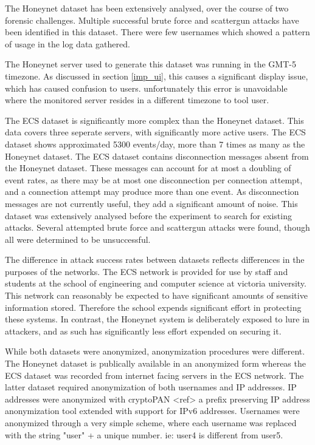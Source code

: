 The Honeynet dataset has been extensively analysed, over the course of two forensic challenges. Multiple successful brute force and scattergun attacks have been identified in this dataset. There were few usernames which showed a pattern of usage in the log data gathered. 

The Honeynet server used to generate this dataset was running in the GMT-5 timezone. As discussed in section \ref{imp_ui}, this causes a significant display issue, which has caused confusion to users. unfortunately this error is unavoidable where the monitored server resides in a different timezone to tool user.

The ECS dataset is significantly more complex than the Honeynet dataset. This data covers three seperate servers, with significantly more active users. The ECS dataset shows approximated 5300 events/day, more than 7 times as many as the Honeynet dataset. The ECS dataset contains disconnection messages absent from the Honeynet dataset. These messages can account for at most a doubling of event rates, as there may be at most one disconnection per connection attempt, and a connection attempt may produce more than one event. As disconnection messages are not currently useful, they add a significant amount of noise. This dataset was extensively analysed before the experiment to search for existing attacks. Several attempted brute force and scattergun attacks were found, though all were determined to be unsuccessful.  

The difference in attack success rates between datasets reflects differences in the purposes of the networks. The ECS network is provided for use by staff and students at the school of engineering and computer science at victoria university. This network can reasonably be expected to have significant amounts of sensitive information stored. Therefore the school expends significant effort in protecting these systems. In contrast, the Honeynet system is deliberately exposed to lure in attackers, and as such has significantly less effort expended on securing it.

While both datasets were anonymized, anonymization procedures were different. The Honeynet dataset is publically available in an anonymized form \cite{forensic10} whereas the ECS dataset was recorded from internet facing servers in the ECS network. The latter dataset required anonymization of both usernames and IP addresses. IP addresses were anonymized with cryptoPAN <ref> a prefix preserving IP address anonymization tool extended with support for IPv6 addresses. Usernames were anonymized through a very simple scheme, where each username was replaced with the string "user" + a unique number. ie: user4 is different from user5.

